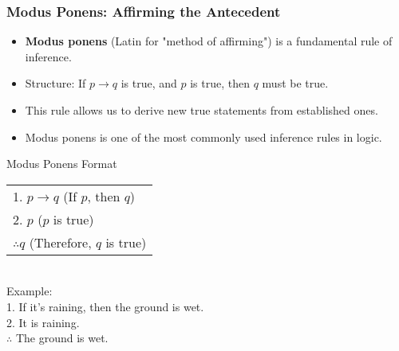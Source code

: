 \documentclass{beamer}
\begin{document}
                            \begin{frame}
                            \frametitle{Modus Ponens: Affirming the Antecedent}
                            \begin{itemize}
                                \item \textbf{Modus ponens} (Latin for "method of affirming") is a fundamental rule of inference.
                                \item Structure: If $p \rightarrow q$ is true, and $p$ is true, then $q$ must be true.
                                \item This rule allows us to derive new true statements from established ones.
                                \item Modus ponens is one of the most commonly used inference rules in logic.
                            \end{itemize}
                            
                            \begin{alertblock}{Modus Ponens Format}
                                \scriptsize
                            \begin{tabular}{l}
                            1. $p \rightarrow q$ \hspace{1cm} (If $p$, then $q$) \\
                            2. $p$ \hspace{2.1cm} ($p$ is true) \\
                            \hline
                            $\therefore q$ \hspace{1.8cm} (Therefore, $q$ is true)
                            \end{tabular}\\[0.3cm]
                            Example:\\
                            1. If it's raining, then the ground is wet.\\
                            2. It is raining.\\
                            $\therefore$ The ground is wet.
                            \end{alertblock}
                            \end{frame}
                            
\end{document}
